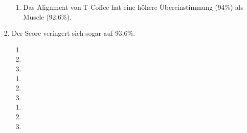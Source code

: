 \documentclass{homework}
\begin{document}
\begin{enumerate}
\begin{enumerate}
\item
Das Alignment von T-Coffee hat eine höhere Übereinstimmung (94\%) als Muscle (92,6\%).
\end{enumerate}

\item
Der Score veringert sich sogar auf 93,6\%.

\begin{enumerate}
\item 
	
\item
	
\item
	
\end{enumerate}


\begin{enumerate}
\item 

\item 

\item 

\end{enumerate}


\begin{enumerate}
\item
	
\item

\item

\end{enumerate}

\end{enumerate}
\end{document}
